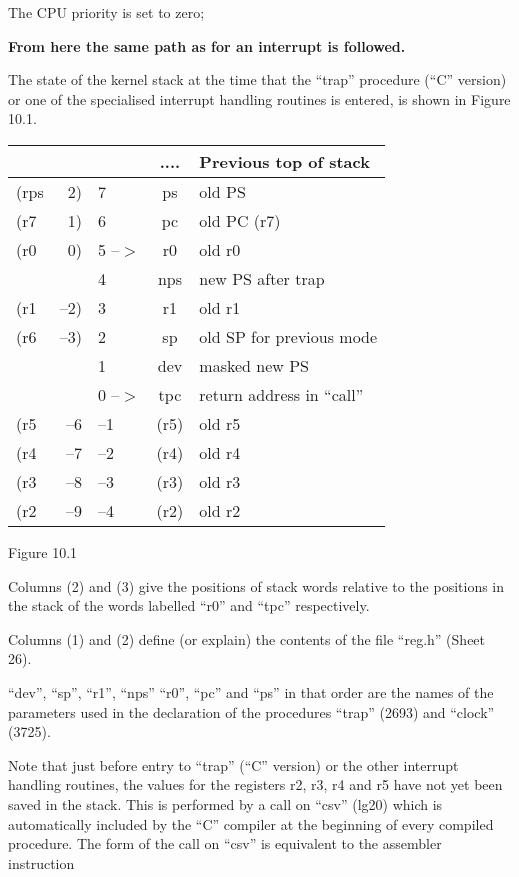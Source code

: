 \item[0773:] The CPU priority is set to zero;

{\bf From here the same path as for an
interrupt is followed.}
\ed



The state of the kernel stack at the
time that the ``trap'' procedure (``C''
version) or one of the specialised
interrupt handling routines is entered,
is shown in Figure 10.1.

\begin{center}
\begin{tabular}{lrl|c|l}
 & & & .... & {\bf Previous top of stack} \\ \hline
(rps & 2)  & 7      & ps   & old PS \\
(r7  & 1)  & 6      & pc   & old PC (r7) \\
(r0  & 0)  & 5 --$>$ & r0   & old r0 \\
     &     & 4      & nps  & new PS after trap \\
(r1  & --2) & 3      & r1   & old r1 \\
(r6  & --3) & 2      & sp   & old SP for previous mode \\
     &     & 1      & dev  & masked new PS \\
     &     & 0 --$>$ & tpc  & return address in ``call'' \\ \hline
(r5  & --6  & --1     & (r5) & old r5 \\
(r4  & --7  & --2     & (r4) & old r4 \\
(r3  & --8  & --3     & (r3) & old r3 \\
(r2  & --9  & --4     & (r2) & old r2 \\
\end{tabular}
\bigskip

Figure 10.1
\end{center}

Columns (2) and (3) give the positions
of stack words relative to the positions in the stack of the words
labelled ``r0'' and ``tpc'' respectively.

Columns (1) and (2) define (or explain)
the contents of the file ``reg.h'' (Sheet 26).

``dev'', ``sp'', ``r1'', ``nps'' ``r0'', ``pc'' and
``ps'' in that order are the names of the
parameters used in the declaration of
the procedures ``trap'' (2693) and
``clock'' (3725).

Note that just before entry to ``trap''
(``C'' version) or the other interrupt
handling routines, the values for the
registers r2, r3, r4 and r5 have not
yet been saved in the stack. This is
performed by a call on ``csv'' (lg20)
which is automatically included by the
``C'' compiler at the beginning of every
compiled procedure. The form of the
call on ``csv'' is equivalent to the
assembler instruction

